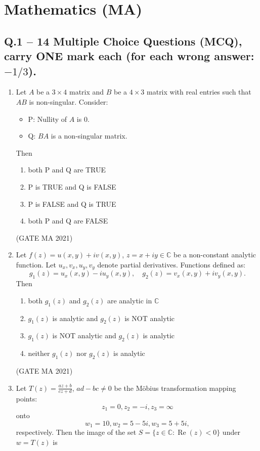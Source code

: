 \documentclass[journal,12pt,onecolumn]{IEEEtran}
\theoremstyle{remark}
\begin{document}
\section*{Mathematics (MA)}
\subsection*{Q.1 -- 14 Multiple Choice Questions (MCQ), carry ONE mark each (for each wrong answer: $-1/3$).}
\begin{enumerate}
    \item Let $A$ be a $3 \times 4$ matrix and $B$ be a $4 \times 3$ matrix with real entries such that $AB$ is non-singular. Consider:
    \begin{itemize}
        \item P: Nullity of $A$ is 0.
        \item Q: $BA$ is a non-singular matrix.
    \end{itemize}
    Then
    \begin{enumerate}
        \item both P and Q are TRUE
        \item P is TRUE and Q is FALSE
        \item P is FALSE and Q is TRUE
        \item both P and Q are FALSE
    \end{enumerate}
\hfill(GATE MA 2021)
    \item Let $f(z) = u(x,y) + i v(x,y)$, $z = x + iy \in \mathbb{C}$ be a non-constant analytic function. Let $u_x, v_x, u_y, v_y$ denote partial derivatives. Functions defined as:
    $$
    g_1(z) = u_x(x,y) - i u_y(x,y), \quad g_2(z) = v_x(x,y) + i v_y(x,y).
    $$
    Then
    \begin{enumerate}
        \item both $g_1(z)$ and $g_2(z)$ are analytic in $\mathbb{C}$
        \item $g_1(z)$ is analytic and $g_2(z)$ is NOT analytic
        \item $g_1(z)$ is NOT analytic and $g_2(z)$ is analytic
        \item neither $g_1(z)$ nor $g_2(z)$ is analytic
    \end{enumerate}
\hfill(GATE MA 2021)
    \item Let $T(z) = \frac{az + b}{cz + d}$, $ad - bc \neq 0$ be the Möbius transformation mapping points:
    $$
    z_1 = 0, z_2 = -i, z_3 = \infty
    $$
    onto
    $$
    w_1 = 10, w_2 = 5 - 5i, w_3 = 5 + 5i,
    $$
    respectively. Then the image of the set $S = \{z \in \mathbb{C} : \operatorname{Re}(z) < 0\}$ under $w = T(z)$ is

\end{enumerate}
\end{document}
